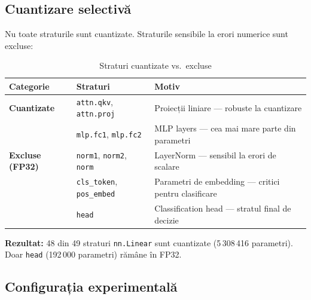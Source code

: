 \documentclass[12pt,a4paper]{article}
\begin{document}
\subsection{Cuantizare selectivă}

Nu toate straturile sunt cuantizate. Straturile sensibile la erori numerice
sunt excluse:

\begin{table}[H]
  \centering
  \caption{Straturi cuantizate vs.\ excluse}
  \begin{tabular}{lll}
    \toprule
    \textbf{Categorie} & \textbf{Straturi} & \textbf{Motiv} \\
    \midrule
    \textcolor{int8color}{\textbf{Cuantizate}} &
      \texttt{attn.qkv}, \texttt{attn.proj} &
      Proiecții liniare --- robuste la cuantizare \\
    & \texttt{mlp.fc1}, \texttt{mlp.fc2} &
      MLP layers --- cea mai mare parte din parametri \\
    \midrule
    \textcolor{fp32color}{\textbf{Excluse (FP32)}} &
      \texttt{norm1}, \texttt{norm2}, \texttt{norm} &
      LayerNorm --- sensibil la erori de scalare \\
    & \texttt{cls\_token}, \texttt{pos\_embed} &
      Parametri de embedding --- critici pentru clasificare \\
    & \texttt{head} &
      Classification head --- stratul final de decizie \\
    \bottomrule
  \end{tabular}
  \label{tab:skip_patterns}
\end{table}

\textbf{Rezultat:} 48 din 49 straturi \texttt{nn.Linear} sunt cuantizate
(5\,308\,416 parametri). Doar \texttt{head} (192\,000 parametri) rămâne
în FP32.

\subsection{Configurația experimentală}
\end{document}
